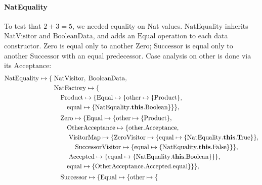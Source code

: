 \paragraph{NatEquality}
\label{sec:nat-equality}
To test that $2 + 3 = 5$, we needed equality on Nat values.
$\mathrm{NatEquality}$ inherits $\mathrm{NatVisitor}$ and $\mathrm{BooleanData}$,
and adds an $\mathrm{Equal}$ operation to each data constructor.
$\mathrm{Zero}$ is equal only to another $\mathrm{Zero}$;
$\mathrm{Successor}$ is equal only to another $\mathrm{Successor}$
with an equal predecessor.
Case analysis on $\mathrm{other}$ is done via its $\mathrm{Acceptance}$:
{\small
  \begin{align*}
    \mathrm{NatEquality} \mapsto \{\;&
      \mathrm{NatVisitor},\; \mathrm{BooleanData},\\
      &\mathrm{NatFactory} \mapsto \{\\
        &\quad \mathrm{Product} \mapsto \{\mathrm{Equal} \mapsto \{
            \mathrm{other} \mapsto \{\mathrm{Product}\},\\
            &\qquad
            \mathrm{equal} \mapsto \{
        \qualifiedthis{\mathrm{NatEquality}}.\mathrm{Boolean}\}\}\},\\[2pt]
        &\quad \mathrm{Zero} \mapsto \{\mathrm{Equal} \mapsto \{
            \mathrm{other} \mapsto \{\mathrm{Product}\},\\
            &\qquad
            \mathrm{OtherAcceptance} \mapsto \{
              \mathrm{other}.\mathrm{Acceptance},\\
              &\qquad\;
              \mathrm{VisitorMap} \mapsto \{
                \mathrm{ZeroVisitor} \mapsto \{
                  \mathrm{equal} \mapsto \{
                \qualifiedthis{\mathrm{NatEquality}}.\mathrm{True}\}\},\\
                &\qquad\;\quad
                \mathrm{SuccessorVisitor} \mapsto \{
                  \mathrm{equal} \mapsto \{
              \qualifiedthis{\mathrm{NatEquality}}.\mathrm{False}\}\}\},\\
              &\qquad\;
              \mathrm{Accepted} \mapsto \{
                \mathrm{equal} \mapsto \{
            \qualifiedthis{\mathrm{NatEquality}}.\mathrm{Boolean}\}\}\},\\
            &\qquad
            \mathrm{equal} \mapsto \{
        \mathrm{OtherAcceptance}.\mathrm{Accepted}.\mathrm{equal}\}\}\},\\[2pt]
        &\quad \mathrm{Successor} \mapsto \{\mathrm{Equal} \mapsto \{
            \mathrm{other} \mapsto \{

\end{align*}}
